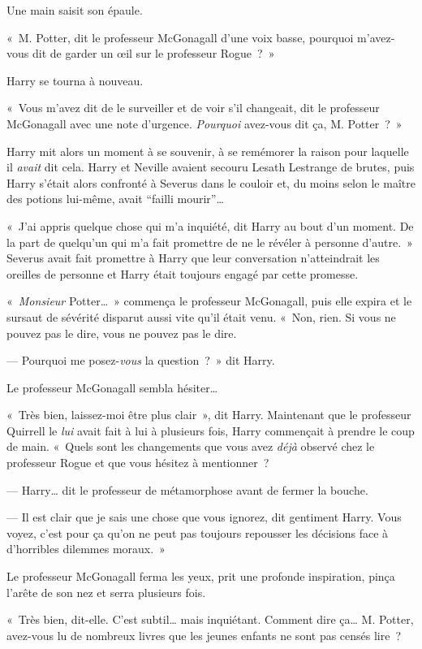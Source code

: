 Une main saisit son épaule.

«~M. Potter, dit le professeur McGonagall d'une voix basse, pourquoi m'avez-vous dit de garder un œil sur le professeur Rogue~?~»

Harry se tourna à nouveau.

«~Vous m'avez dit de le surveiller et de voir s'il changeait, dit le professeur McGonagall avec une note d'urgence. \emph{Pourquoi} avez-vous dit ça, M. Potter~?~»

Harry mit alors un moment à se souvenir, à se remémorer la raison pour laquelle il \emph{avait} dit cela. Harry et Neville avaient secouru Lesath Lestrange de brutes, puis Harry s'était alors confronté à Severus dans le couloir et, du moins selon le maître des potions lui-même, avait “failli mourir”…

«~J'ai appris quelque chose qui m'a inquiété, dit Harry au bout d'un moment. De la part de quelqu'un qui m'a fait promettre de ne le révéler à personne d'autre.~» Severus avait fait promettre à Harry que leur conversation n'atteindrait les oreilles de personne et Harry était toujours engagé par cette promesse.

«~\emph{Monsieur} Potter…~» commença le professeur McGonagall, puis elle expira et le sursaut de sévérité disparut aussi vite qu'il était venu. «~Non, rien. Si vous ne pouvez pas le dire, vous ne pouvez pas le dire.

--- Pourquoi me posez-\emph{vous} la question~?~» dit Harry.

Le professeur McGonagall sembla hésiter…

«~Très bien, laissez-moi être plus clair~», dit Harry. Maintenant que le professeur Quirrell le \emph{lui} avait fait à lui à plusieurs fois, Harry commençait à prendre le coup de main. «~Quels sont les changements que vous avez \emph{déjà} observé chez le professeur Rogue et que vous hésitez à mentionner~?

--- Harry… dit le professeur de métamorphose avant de fermer la bouche.

--- Il est clair que je sais une chose que vous ignorez, dit gentiment Harry. Vous voyez, c'est pour ça qu'on ne peut pas toujours repousser les décisions face à d'horribles dilemmes moraux.~»

Le professeur McGonagall ferma les yeux, prit une profonde inspiration, pinça l'arête de son nez et serra plusieurs fois.

«~Très bien, dit-elle. C'est subtil… mais inquiétant. Comment dire ça… M. Potter, avez-vous lu de nombreux livres que les jeunes enfants ne sont pas censés lire~?

